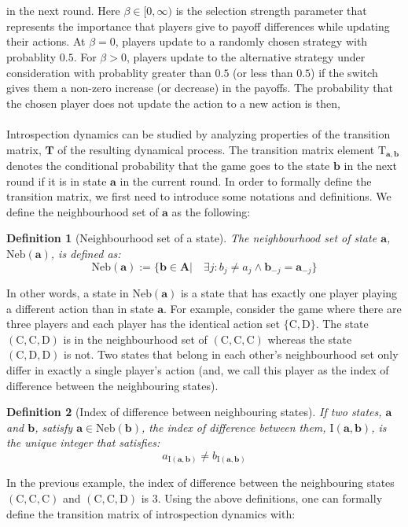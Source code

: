 \documentclass[11pt]{article}
\theoremstyle{plainCl1}
\newtheorem{definition}{Definition}
\theoremstyle{plainCl2}
\newcommand{\A}{\mathbf{A}}
\newcommand{\abf}{\mathbf{a}}
\newcommand{\bbf}{\mathbf{b}}
\newcommand{\T}{\mathbf{T}}
\newcommand{\C}{\mathrm{C}}
\newcommand{\D}{\mathrm{D}}
\begin{document}
\\ \\ \noindent in the next round. Here $\beta \in [0,\infty)$ is the selection strength parameter that represents the importance that players give to payoff differences while updating their actions. At $\beta = 0$, players update to a randomly chosen strategy with probablity $0.5$. For $\beta > 0$, players update to the alternative strategy under consideration with probablity greater than $0.5$ (or less than $0.5$) if the switch gives them a non-zero increase (or decrease) in the payoffs. The probability that the chosen player does not update the action to a new action is then, \\ \\ 
\noindent Introspection dynamics can be studied by analyzing properties of the transition matrix, $\T$ of the resulting dynamical process. The transition matrix element $\mathrm{T}_{\abf,\bbf}$ denotes the conditional probability that the game goes to the state $\bbf$ in the next round if it is in state $\abf$ in the current round. In order to formally define the transition matrix, we first need to introduce some notations and definitions. We define the neighbourhood set of $\abf$ as the following:

\begin{definition}[Neighbourhood set of a state] The neighbourhood set of state $\abf$, $\mathrm{Neb}(\abf)$, is defined as:
\begin{equation}
\mathrm{Neb}(\abf) := \{\bbf \in \A  \big| \quad \exists j:  b_{j} \neq a_{j} \land \bbf_{-j} = \abf_{-j}  \}
\label{Eq:neighbourhood-states}
\end{equation} 
\label{Def:neighbourhood-states}
\end{definition} 
\noindent In other words, a state in $\mathrm{Neb}(\abf)$ is a state that has exactly one player playing a different action than in state $\abf$. For example, consider the game where there are  three players and each player has the identical action set $\{\C, \D \}$.  The state $(\C,\C,\D)$ is in the neighbourhood set of $(\C,\C,\C)$ whereas the state $(\C,\D,\D)$ is not. Two states that belong in each other's neighbourhood set only differ in exactly a single player's action (and, we call this player as the index of difference between the neighbouring states).

\begin{definition} [Index of difference between neighbouring states] If two states, $\abf$ and $\bbf$, satisfy $\abf \in \mathrm{Neb}(\bbf)$, the index of difference between them, $\mathrm{I}(\abf, \bbf)$, is the unique integer that satisfies:
\begin{equation}
a_{\mathrm{I}(\abf, \bbf)} \neq b_{\mathrm{I}(\abf, \bbf)}
\end{equation} 
\label{Def:index-of-difference}
\end{definition} 
\noindent In the previous example, the index of difference between the neighbouring states $(\C,\C,\C)$ and $(\C,\C,\D)$ is $3$. Using the above definitions, one can formally define the transition matrix of introspection dynamics with:
\end{document}
